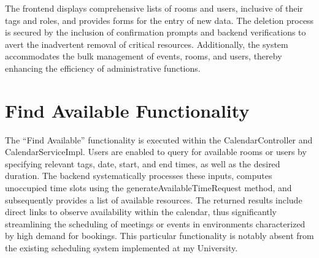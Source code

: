 The frontend displays comprehensive lists of rooms and users, inclusive of their tags and roles, and provides forms for the entry of new data.
The deletion process is secured by the inclusion of confirmation prompts and backend verifications to avert the inadvertent removal of critical resources.
Additionally, the system accommodates the bulk management of events, rooms, and users, thereby enhancing the efficiency of administrative functions.


\section{Find Available Functionality}\label{sec:find-available-functionality}
The ``Find Available'' functionality is executed within the CalendarController and CalendarServiceImpl.
Users are enabled to query for available rooms or users by specifying relevant tags, date, start, and end times, as well as the desired duration.
The backend systematically processes these inputs, computes unoccupied time slots using the generateAvailableTimeRequest method, and subsequently provides a list of available resources.
The returned results include direct links to observe availability within the calendar, thus significantly streamlining the scheduling of meetings or events in environments characterized by high demand for bookings.
This particular functionality is notably absent from the existing scheduling system implemented at my University.
